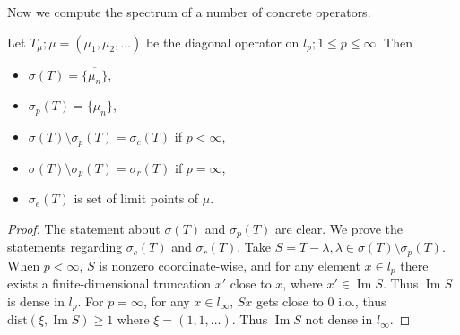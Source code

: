 Now we compute the spectrum of a number of concrete operators.

\begin{proposition}
	Let $T_\mu; \mu = (\mu_1, \mu_2, \ldots)$ be the diagonal operator on $l_p; 1 \le p \le \infty $. Then
	\begin{itemize}
		\item $\sigma(T) = \overline{\{\mu_n\} } $,
		\item $\sigma_p(T) = \{\mu_n\} $,
		\item $\sigma(T) \setminus \sigma_p(T) = \sigma_c(T)$ if $p < \infty $,
		\item $\sigma(T) \setminus \sigma_p(T) = \sigma_r(T)$ if $p = \infty $,
		\item $\sigma_e(T)$ is set of limit points of $\mu$.
	\end{itemize}
\end{proposition}
\begin{proof}
	
	The statement about $\sigma(T)$ and $\sigma_p(T)$ are clear.
	We prove the statements regarding $\sigma_c(T)$ and $\sigma_r(T)$. Take $S = T - \lambda, \lambda \in \sigma(T) \setminus \sigma_p(T)$. When $p < \infty$, $S$ is nonzero coordinate-wise, and for any element $x \in l_p$ there exists a finite-dimensional truncation $x'$ close to $x$, where $x' \in \operatorname{Im} S$.  Thus $\operatorname{Im} S$ is dense in $l_p$. For $p = \infty $, for any $x \in l_\infty $, $S x$ gets close to $0$ i.o., thus $\text{dist}(\xi, \operatorname{Im} S) \ge 1$ where $\xi= (1,1, \ldots)$. Thus  $\operatorname{Im} S$ not dense in $l_\infty $.
\end{proof}


